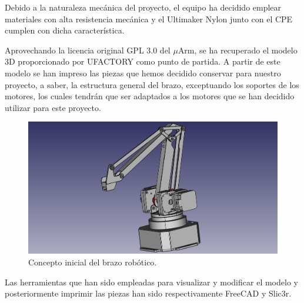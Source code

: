 Debido a la naturaleza mecánica del proyecto, el equipo ha decidido emplear materiales con alta resistencia mecánica y el Ultimaker Nylon junto con el CPE cumplen con dicha característica.

Aprovechando la licencia original GPL 3.0 del $\mu$Arm, se ha recuperado el modelo 3D proporcionado por UFACTORY como punto de partida. A partir de este modelo se han impreso las piezas que hemos decidido conservar para nuestro proyecto, a saber, la estructura general del brazo, exceptuando los soportes de los motores, los cuales tendrán que ser adaptados a los motores que se han decidido utilizar para este proyecto.

\begin{figure}[H]
    \centering
    \includegraphics[width=.8\linewidth]{pictures/brazo_vista_3d_inicial.png}
    \caption{Concepto inicial del brazo robótico.}
    \label{fig:manipulador_inicial}
\end{figure}

Las herramientas que han sido empleadas para visualizar y modificar el modelo y posteriormente imprimir las piezas han sido respectivamente FreeCAD y Slic3r.

